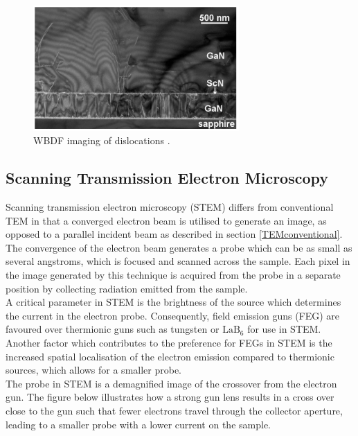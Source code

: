 \begin{figure}[!ht]
	\centering
	\includegraphics[width=0.7\textwidth]{Figs/Ch2/moramwbdf.png}
	\caption[h] {WBDF imaging of dislocations \cite{Moram2007}.}
	\label{shellywbdf}
\end{figure}
\FloatBarrier



\subsection{Scanning Transmission Electron Microscopy}

Scanning transmission electron microscopy (STEM) differs from conventional TEM in that a converged electron beam is utilised to generate an image, as opposed to a parallel incident beam as described in section \ref{TEMconventional}. The convergence of the electron beam generates a probe which can be as small as several angstroms, which is focused and scanned across the sample. Each pixel in the image generated by this technique is acquired from the probe in a separate position by collecting radiation emitted from the sample.\\
A critical parameter in STEM is the brightness of the source which determines the current in the electron probe. Consequently, field emission guns (FEG) are favoured over thermionic guns such as tungsten or $\mathrm{LaB_{6}}$ for use in STEM. Another factor which contributes to the preference for FEGs in STEM is the increased spatial localisation of the electron emission compared to thermionic sources, which allows for a smaller probe.\\
The probe in STEM is a demagnified image of the crossover from the electron gun. The figure below illustrates how a strong gun lens results in a cross over close to the gun such that fewer electrons travel through the collector aperture, leading to a smaller probe with a lower current on the sample. 

